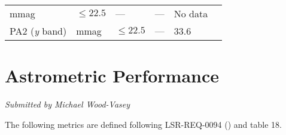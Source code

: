 \documentclass[DM,toc]{lsstdoc}
\begin{document}
\begin{longtable}[]{@{}llllll@{}}
\begin{minipage}[t]{0.06\columnwidth}
mmag\strut
\end{minipage} & \begin{minipage}[t]{0.17\columnwidth}\raggedright\strut
\(\leq 22.5\)\strut
\end{minipage} & \begin{minipage}[t]{0.17\columnwidth}\raggedright\strut
---\strut
\end{minipage} & \begin{minipage}[t]{0.12\columnwidth}\raggedright\strut
---\strut
\end{minipage} & \begin{minipage}[t]{0.17\columnwidth}\raggedright\strut
No data\strut
\end{minipage}\tabularnewline
\begin{minipage}[t]{0.14\columnwidth}\raggedright\strut
PA2 (\emph{y} band)\strut
\end{minipage} & \begin{minipage}[t]{0.06\columnwidth}\raggedright\strut
mmag\strut
\end{minipage} & \begin{minipage}[t]{0.17\columnwidth}\raggedright\strut
\(\leq 22.5\)\strut
\end{minipage} & \begin{minipage}[t]{0.17\columnwidth}\raggedright\strut
---\strut
\end{minipage} & \begin{minipage}[t]{0.12\columnwidth}\raggedright\strut
33.6\strut
\end{minipage} & \begin{minipage}[t]{0.17\columnwidth}\raggedright\strut
\strut
\end{minipage}\tabularnewline
\bottomrule
\end{longtable}

\section{Astrometric Performance}\label{astrometric-performance}

\emph{Submitted by Michael Wood-Vasey}

The following metrics are defined following LSR-REQ-0094
() and
 table 18.
\end{document}
